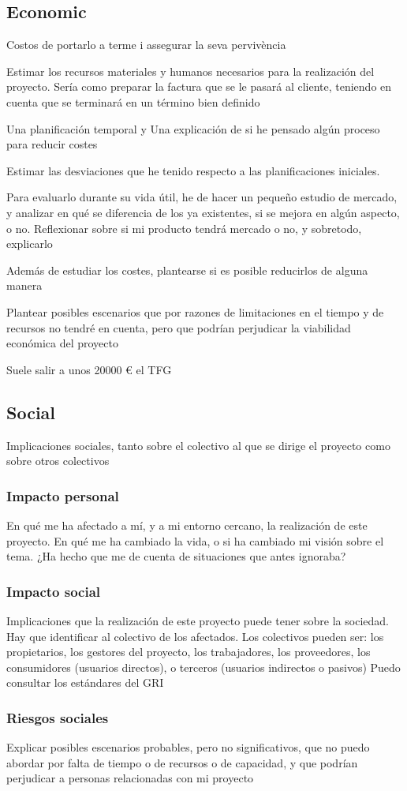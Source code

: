 \subsection{Economic}
Costos de portarlo a terme i assegurar la seva pervivència

Estimar los recursos materiales y humanos necesarios para la realización del
proyecto. Sería como preparar la factura que se le pasará al cliente, teniendo
en cuenta que se terminará en un término bien definido

Una planificación temporal y
Una explicación de si he pensado algún proceso para reducir costes

Estimar las desviaciones que he tenido respecto a las planificaciones iniciales.

Para evaluarlo durante su vida útil, he de hacer un pequeño estudio de mercado,
y analizar en qué se diferencia de los ya existentes, si se mejora en algún
aspecto, o no.
Reflexionar sobre si mi producto tendrá mercado o no, y sobretodo, explicarlo

Además de estudiar los costes, plantearse si es posible reducirlos de alguna
manera

Plantear posibles escenarios que por razones de limitaciones en el tiempo y de
recursos no tendré en cuenta, pero que podrían perjudicar la viabilidad
económica del proyecto

Suele salir a unos 20000 \euro{} el TFG

\subsection{Social}

Implicaciones sociales, tanto sobre el colectivo al que se dirige el proyecto
como sobre otros colectivos

\subsubsection{Impacto personal}
En qué me ha afectado a mí, y a mi entorno cercano, la realización de este
proyecto. En qué me ha cambiado la vida, o si ha cambiado mi visión sobre el
tema.
¿Ha hecho que me de cuenta de situaciones que antes ignoraba?

\subsubsection{Impacto social}
Implicaciones que la realización de este proyecto puede tener sobre la sociedad.
Hay que identificar al colectivo de los afectados.
Los colectivos pueden ser: los propietarios, los gestores del proyecto, los
trabajadores, los proveedores, los consumidores (usuarios directos), o terceros
(usuarios indirectos o pasivos)
Puedo consultar los estándares del GRI

\subsubsection{Riesgos sociales}
Explicar posibles escenarios probables, pero no significativos, que no puedo
abordar por falta de tiempo o de recursos o de capacidad, y que podrían
perjudicar a personas relacionadas con mi proyecto

